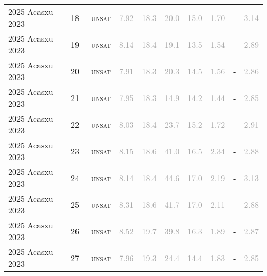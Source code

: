 \begin{center}
{\begin{longtable}{@{}llllllllll@{}}
2025 Acasxu 2023 & 18 & ~\textsc{unsat} & \textcolor{darkgray}{7.92} & \textcolor{darkgray}{18.3} & \textcolor{darkgray}{20.0} & \textcolor{darkgray}{15.0} & \textcolor{darkgray}{1.70} & - & \textcolor{darkgray}{3.14} \\
2025 Acasxu 2023 & 19 & ~\textsc{unsat} & \textcolor{darkgray}{8.14} & \textcolor{darkgray}{18.4} & \textcolor{darkgray}{19.1} & \textcolor{darkgray}{13.5} & \textcolor{darkgray}{1.54} & - & \textcolor{darkgray}{2.89} \\
2025 Acasxu 2023 & 20 & ~\textsc{unsat} & \textcolor{darkgray}{7.91} & \textcolor{darkgray}{18.3} & \textcolor{darkgray}{20.3} & \textcolor{darkgray}{14.5} & \textcolor{darkgray}{1.56} & - & \textcolor{darkgray}{2.86} \\
2025 Acasxu 2023 & 21 & ~\textsc{unsat} & \textcolor{darkgray}{7.95} & \textcolor{darkgray}{18.3} & \textcolor{darkgray}{14.9} & \textcolor{darkgray}{14.2} & \textcolor{darkgray}{1.44} & - & \textcolor{darkgray}{2.85} \\
2025 Acasxu 2023 & 22 & ~\textsc{unsat} & \textcolor{darkgray}{8.03} & \textcolor{darkgray}{18.4} & \textcolor{darkgray}{23.7} & \textcolor{darkgray}{15.2} & \textcolor{darkgray}{1.72} & - & \textcolor{darkgray}{2.91} \\
2025 Acasxu 2023 & 23 & ~\textsc{unsat} & \textcolor{darkgray}{8.15} & \textcolor{darkgray}{18.6} & \textcolor{darkgray}{41.0} & \textcolor{darkgray}{16.5} & \textcolor{darkgray}{2.34} & - & \textcolor{darkgray}{2.88} \\
2025 Acasxu 2023 & 24 & ~\textsc{unsat} & \textcolor{darkgray}{8.14} & \textcolor{darkgray}{18.4} & \textcolor{darkgray}{44.6} & \textcolor{darkgray}{17.0} & \textcolor{darkgray}{2.19} & - & \textcolor{darkgray}{3.13} \\
2025 Acasxu 2023 & 25 & ~\textsc{unsat} & \textcolor{darkgray}{8.31} & \textcolor{darkgray}{18.6} & \textcolor{darkgray}{41.7} & \textcolor{darkgray}{17.0} & \textcolor{darkgray}{2.11} & - & \textcolor{darkgray}{2.88} \\
2025 Acasxu 2023 & 26 & ~\textsc{unsat} & \textcolor{darkgray}{8.52} & \textcolor{darkgray}{19.7} & \textcolor{darkgray}{39.8} & \textcolor{darkgray}{16.3} & \textcolor{darkgray}{1.89} & - & \textcolor{darkgray}{2.87} \\
2025 Acasxu 2023 & 27 & ~\textsc{unsat} & \textcolor{darkgray}{7.96} & \textcolor{darkgray}{19.3} & \textcolor{darkgray}{24.4} & \textcolor{darkgray}{14.4} & \textcolor{darkgray}{1.83} & - & \textcolor{darkgray}{2.85} \\

\end{longtable}}
\end{center}
